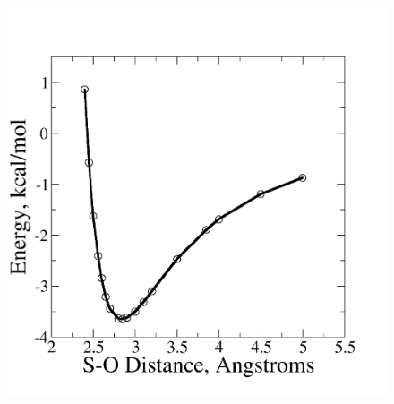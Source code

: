 \documentclass{article}
\begin{document}
\begin{figure}[h!]
	\begin{center}
		\includegraphics[scale=1.0]{images/energy/interaction-energy.png}
	\end{center}
\end{figure}
\end{document}
